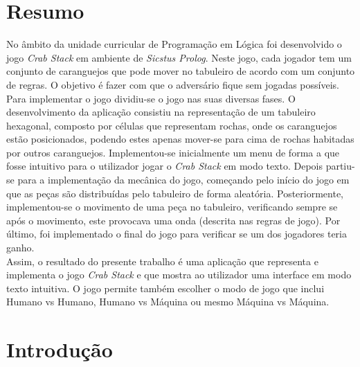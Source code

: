 \documentclass[a4paper]{article}
\begin{document}

\newpage

\section*{Resumo}
No âmbito da unidade curricular de  Programação em Lógica  foi desenvolvido o jogo \textit{Crab Stack} em ambiente de \textit{Sicstus Prolog}. Neste jogo, cada jogador tem um conjunto de caranguejos que pode mover no tabuleiro de acordo com um conjunto de regras. O objetivo é fazer com que o adversário fique sem jogadas possíveis. \\

Para implementar o jogo dividiu-se o jogo nas suas diversas fases. O desenvolvimento da aplicação consistiu na representação de um tabuleiro hexagonal, composto por células que representam rochas, onde os caranguejos estão posicionados, podendo estes apenas mover-se para cima de rochas habitadas por outros caranguejos. Implementou-se inicialmente um menu de forma a que fosse intuitivo para o utilizador jogar o \textit{Crab Stack} em modo texto. Depois partiu-se para a implementação da mecânica do jogo, começando pelo início do jogo em que as peças são distribuídas pelo tabuleiro de forma aleatória. Posteriormente, implementou-se o movimento de uma peça no tabuleiro, verificando sempre se após o movimento, este provocava uma onda (descrita nas regras de jogo). Por último, foi implementado o final do jogo para verificar se um dos jogadores teria ganho.\\

Assim, o resultado do presente trabalho é uma aplicação que representa e implementa o jogo \textit{Crab Stack} e que mostra ao utilizador uma interface em modo texto intuitiva. O jogo permite também escolher o modo de jogo que inclui  Humano vs Humano, Humano vs Máquina ou mesmo Máquina vs Máquina.\\

\newpage

\tableofcontents

\newpage
\section{Introdução}
\end{document}

